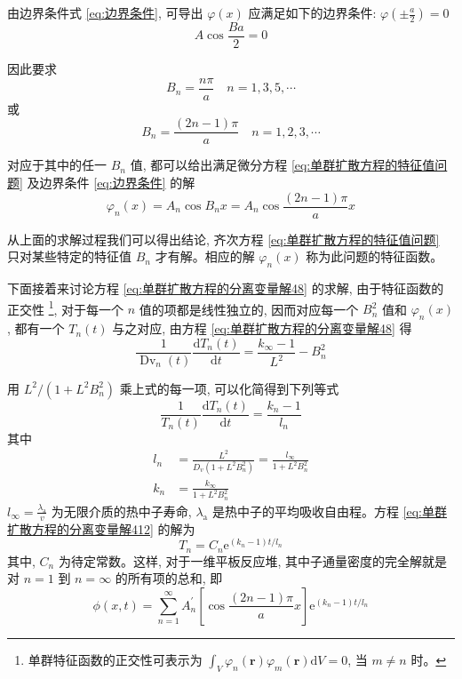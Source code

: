\documentclass{Sichuan Normal University}
\begin{document}
由边界条件式 \eqref{eq:边界条件}, 可导出 $\varphi(x)$ 应满足如下的边界条件: $\varphi\left( \pm \frac{a}{2}\right)=0$
\begin{equation}
A \cos \frac{B a}{2}=0
\end{equation}

因此要求
\begin{equation}
B_n=\frac{n \pi}{a} \quad n=1,3,5, \cdots
\end{equation}
或
\begin{equation}
B_n=\frac{(2 n-1) \pi}{a} \quad n=1,2,3, \cdots
\label{eq:单群扩散方程的特征值问题410}
\end{equation}

对应于其中的任一 $B_n$ 值, 都可以给出满足微分方程 \eqref{eq:单群扩散方程的特征值问题} 及边界条件 \eqref{eq:边界条件} 的解
\begin{equation}
\varphi_n(x)=A_n \cos B_n x=A_n \cos \frac{(2 n-1) \pi}{a} x
\end{equation}

从上面的求解过程我们可以得出结论, 齐次方程 \eqref{eq:单群扩散方程的特征值问题} 只对某些特定的特征值 $B_n$ 才有解。相应的解 $\varphi_n(x)$ 称为此问题的特征函数。

下面接着来讨论方程 \eqref{eq:单群扩散方程的分离变量解48} 的求解, 由于特征函数的正交性 \footnote{单群特征函数的正交性可表示为 $\int_V \varphi_n(\boldsymbol{r}) \varphi_m(\boldsymbol{r}) \mathrm{d} V=0$, 当 $m \neq n$ 时。
}, 对于每一个 $n$ 值的项都是线性独立的, 因而对应每一个 $B_n^2$ 值和 $\varphi_n(x)$, 都有一个 $T_n(t)$ 与之对应, 由方程 \eqref{eq:单群扩散方程的分离变量解48} 得
\begin{equation}
\frac{1}{\operatorname{Dv}_n(t)} \frac{\mathrm{d} T_n(t)}{\mathrm{d} t}=\frac{k_{\infty}-1}{L^2}-B_n^2
\end{equation}

用 $L^2 /\left(1+L^2 B_n^2\right)$ 乘上式的每一项, 可以化简得到下列等式
\begin{equation}
\frac{1}{T_n(t)} \frac{\mathrm{d} T_n(t)}{\mathrm{d} t}=\frac{k_n-1}{l_n}
\label{eq:单群扩散方程的分离变量解412}
\end{equation}
其中
\begin{align}
l_n&=\frac{L^2}{D_v\left(1+L^2 B_n^2\right)}=\frac{l_{\infty}}{1+L^2 B_n^2} \label{eq:413}\\
k_n&=\frac{k_{\infty}}{1+L^2 B_n^2}\label{eq:414}
\end{align}
$l_{\infty}=\frac{\lambda_{\mathrm{a}}}{v}$ 为无限介质的热中子寿命, $\lambda_{\mathrm{a}}$ 是热中子的平均吸收自由程。方程 \eqref{eq:单群扩散方程的分离变量解412} 的解为
\begin{equation}
T_n=C_n \mathrm{e}^{\left(k_n-1\right) t / l_n}
\end{equation}
其中, $C_n$ 为待定常数。这样, 对于一维平板反应堆, 其中子通量密度的完全解就是对 $n=1$ 到 $n=\infty$ 的所有项的总和, 即
\begin{equation}
\phi(x, t)=\sum_{n=1}^{\infty} A_n^{\prime}\left[\cos \frac{(2 n-1) \pi}{a} x\right] \mathrm{e}^{\left(k_n-1\right) t / l_n}
\label{eq:单群扩散方程的分离变量解415}
\end{equation}
\end{document}
